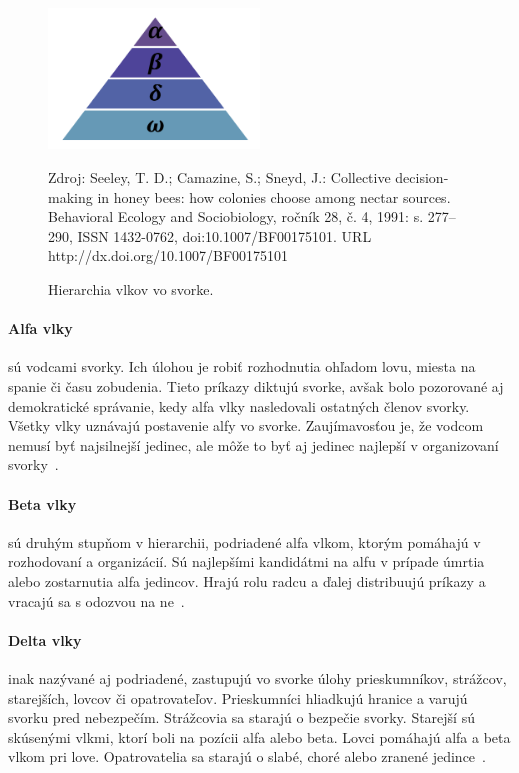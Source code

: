 \documentclass[a4paper,slovak,12pt,appendix]{article}
\newcommand{\source}[1]{\caption*{\footnotesize Zdroj: {#1}} }
\begin{document}
\begin{figure}[!ht]
  \centering
  \includegraphics[width=0.5\textwidth]{wolf_hierarchy.png}
  \caption{Hierarchia vlkov vo svorke.}
	\source{Seeley, T. D.; Camazine, S.; Sneyd, J.: Collective decision-making in
					honey bees: how colonies choose among nectar sources. Behavioral
					Ecology and Sociobiology, ročník 28, č. 4, 1991: s. 277–290, ISSN
					1432-0762, doi:10.1007/BF00175101. URL http://dx.doi.org/10.1007/BF00175101}
  \label{fig-wolf-hierarchy}
\end{figure}

\paragraph{Alfa vlky} sú vodcami svorky. Ich úlohou je robiť rozhodnutia
ohľadom lovu, miesta na spanie či času zobudenia. Tieto príkazy diktujú svorke,
avšak bolo pozorované aj demokratické správanie, kedy alfa vlky nasledovali
ostatných členov svorky. Všetky vlky uznávajú postavenie alfy vo svorke.
Zaujímavosťou je, že vodcom nemusí byť najsilnejší jedinec, ale môže to
byť aj jedinec najlepší v organizovaní svorky~\cite{Seeley1991}.

\paragraph{Beta vlky} sú druhým stupňom v hierarchii, podriadené alfa vlkom,
ktorým pomáhajú v rozhodovaní a organizácií. Sú najlepšími kandidátmi na alfu
v prípade úmrtia alebo zostarnutia alfa jedincov. Hrajú rolu radcu a ďalej
distribuujú príkazy a vracajú sa s odozvou na ne~\cite{Seeley1991}.

\paragraph{Delta vlky} inak nazývané aj podriadené, zastupujú vo svorke
úlohy prieskumníkov, strážcov, starejších, lovcov či opatrovateľov.
Prieskumníci hliadkujú hranice a varujú svorku pred nebezpečím. Strážcovia
sa starajú o bezpečie svorky. Starejší sú skúsenými vlkmi, ktorí boli na pozícii
alfa alebo beta. Lovci pomáhajú alfa a beta vlkom pri love. Opatrovatelia sa
starajú o slabé, choré alebo zranené jedince~\cite{Seeley1991}.
\end{document}
